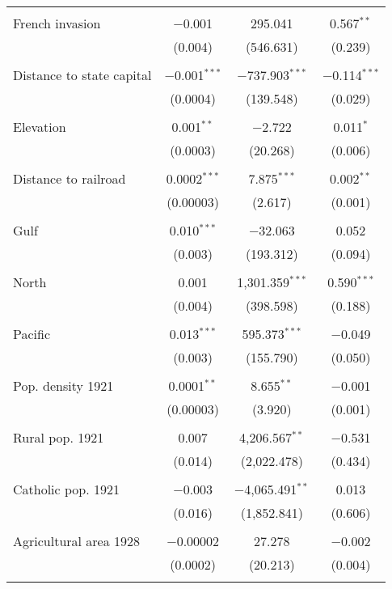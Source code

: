 \begin{table}[!htbp]
\begin{tabular}{@{\extracolsep{5pt}}lccc}
  & & & \\ 
 French invasion & $-$0.001 & 295.041 & 0.567$^{**}$ \\ 
  & (0.004) & (546.631) & (0.239) \\ 
  & & & \\ 
 Distance to state capital & $-$0.001$^{***}$ & $-$737.903$^{***}$ & $-$0.114$^{***}$ \\ 
  & (0.0004) & (139.548) & (0.029) \\ 
  & & & \\ 
 Elevation & 0.001$^{**}$ & $-$2.722 & 0.011$^{*}$ \\ 
  & (0.0003) & (20.268) & (0.006) \\ 
  & & & \\ 
 Distance to railroad & 0.0002$^{***}$ & 7.875$^{***}$ & 0.002$^{**}$ \\ 
  & (0.00003) & (2.617) & (0.001) \\ 
  & & & \\ 
 Gulf & 0.010$^{***}$ & $-$32.063 & 0.052 \\ 
  & (0.003) & (193.312) & (0.094) \\ 
  & & & \\ 
 North & 0.001 & 1,301.359$^{***}$ & 0.590$^{***}$ \\ 
  & (0.004) & (398.598) & (0.188) \\ 
  & & & \\ 
 Pacific & 0.013$^{***}$ & 595.373$^{***}$ & $-$0.049 \\ 
  & (0.003) & (155.790) & (0.050) \\ 
  & & & \\ 
 Pop. density 1921 & 0.0001$^{**}$ & 8.655$^{**}$ & $-$0.001 \\ 
  & (0.00003) & (3.920) & (0.001) \\ 
  & & & \\ 
 Rural pop. 1921 & 0.007 & 4,206.567$^{**}$ & $-$0.531 \\ 
  & (0.014) & (2,022.478) & (0.434) \\ 
  & & & \\ 
 Catholic pop. 1921 & $-$0.003 & $-$4,065.491$^{**}$ & 0.013 \\ 
  & (0.016) & (1,852.841) & (0.606) \\ 
  & & & \\ 
 Agricultural area 1928 & $-$0.00002 & 27.278 & $-$0.002 \\ 
  & (0.0002) & (20.213) & (0.004) \\ 
  & & & \\ 

\end{tabular}
\end{table}
